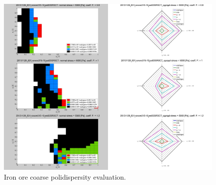 \begin{figure}[!htb]
\centering
\includegraphics[width=.96\columnwidth]{images/083ironore31510}
\caption[Iron ore coarse polidispersity evaluation]{Iron ore coarse polidispersity
evaluation.}
\label{fig:083ironore31510}
\end{figure}